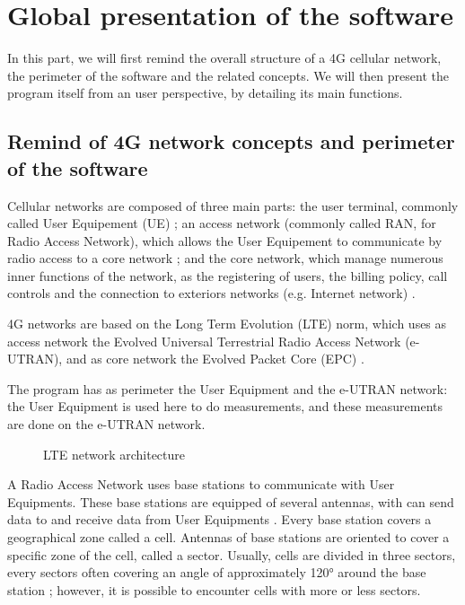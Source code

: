 \documentclass[a4paper, 11pt]{report}
\begin{document}
    \newpage
    
    \section{Global presentation of the software}
    
    In this part, we will first remind the overall structure of a 4G cellular network, the perimeter of the software and the related concepts. We will then present the program itself from an user perspective, by detailing its main functions.
    
    \subsection{Remind of 4G network concepts and perimeter of the software}
    Cellular networks are composed of three main parts: the user terminal, commonly called User Equipement (UE) ; an access network (commonly called RAN, for Radio Access Network), which allows the User Equipement to communicate by radio access to a core network ; and the core network, which manage numerous inner functions of the network, as the registering of users, the billing policy, call controls and the connection to exteriors networks (e.g. Internet network) \cite{bouguen_lte_2012}. \newline
    
    4G networks are based on the Long Term Evolution (LTE) norm, which uses as access network the Evolved Universal Terrestrial Radio Access Network (e-UTRAN), and as core network the Evolved Packet Core (EPC) \cite{bouguen_lte_2012}. \newline
    
    The program has as perimeter the User Equipment and the e-UTRAN network: the User Equipment is used here to do measurements, and these measurements are done on the e-UTRAN network. \newline
    
    \begin{figure}[H]
    \centering
    
    \caption{LTE network architecture}
    \label{LTE Network Architecture}
    \end{figure}
    
    A Radio Access Network uses base stations to communicate with User Equipments. These base stations are equipped of several antennas, with can send data to and receive data from User Equipments \cite{bouguen_lte_2012}. Every base station covers a geographical zone called a cell. Antennas of base stations  are oriented to cover a specific zone of the cell, called a sector. Usually, cells are divided in three sectors, every sectors often covering an angle of approximately 120° around the base station ; however, it is possible to encounter cells with more or less sectors. \newline
    
\end{document}
